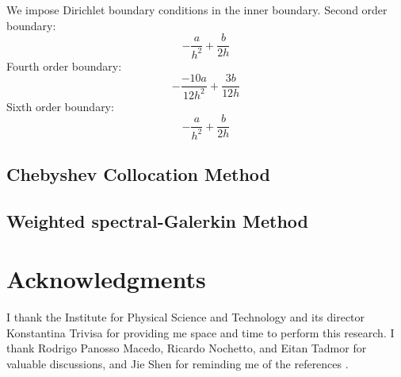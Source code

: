 \documentclass[draft,onefignum,onetabnum]{siamart190516}
\begin{document}
We impose Dirichlet boundary conditions in the inner boundary. 
Second order boundary:
\[ -\frac{a}{h^2} + \frac{b}{2h} \]
Fourth order boundary:
\[ -\frac{-10a}{12 h^2} + \frac{3 b}{12h} \]
Sixth order boundary:
\[ -\frac{a}{h^2} + \frac{b}{2h} \]

\subsection{Chebyshev Collocation Method}


\subsection{Weighted spectral-Galerkin Method}


\section*{Acknowledgments}
I thank the Institute for Physical Science and Technology and its director Konstantina Trivisa for providing me space and time to perform this research. I thank Rodrigo Panosso Macedo, Ricardo Nochetto, and Eitan Tadmor for valuable discussions, and Jie Shen for reminding me of the references \cite{wang2017perfect, yang2021truly}. 



%


\end{document}
